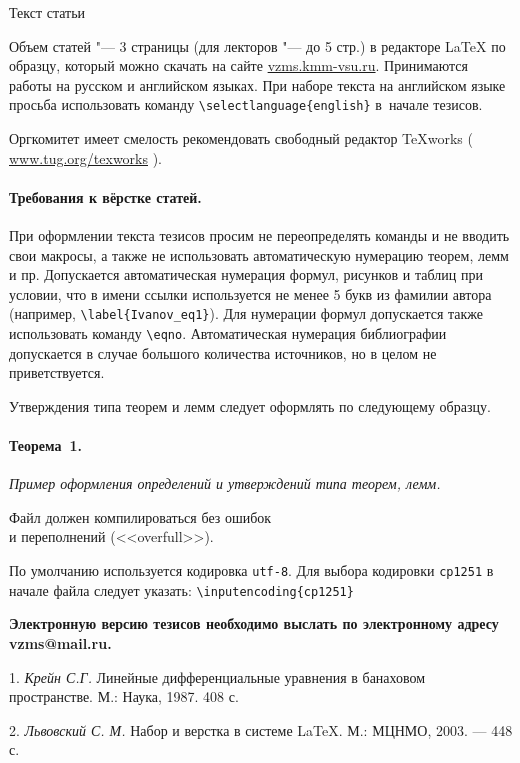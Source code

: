 \documentclass{vzmsthesis}
\begin{document}

\vzmscaption


Текст статьи


Объем статей "--- 3 страницы (для лекторов "--- до 5 стр.)
в редакторе \LaTeX{} по образцу, который можно скачать на
сайте \href{https://vzms.kmm-vsu.ru}{vzms.kmm-vsu.ru}.
Принимаются работы на русском и английском языках.
При наборе текста на английском языке просьба использовать команду
\verb`\selectlanguage{english}`
в~начале тезисов.

Оргкомитет имеет смелость рекомендовать свободный редактор TeXworks
( \href{https://www.tug.org/texworks/}{www.tug.org/texworks} ).

\paragraph{Требования к вёрстке статей.}
При оформлении текста тезисов просим не переопределять команды и не
вводить свои макросы, а также не использовать автоматическую
нумерацию теорем, лемм и пр.
Допускается автоматическая нумерация формул, рисунков и таблиц
при условии, что в имени ссылки используется не менее 5 букв из фамилии автора
(например, \verb`\label{Ivanov_eq1}`).
Для нумерации формул допускается также использовать команду \verb"\eqno".
Автоматическая нумерация библиографии допускается в случае большого количества источников,
но в целом не приветствуется.

Утверждения типа теорем и лемм следует оформлять по следующему
образцу.

\paragraph{Теорема~1.} {\it
	Пример оформления определений и утверждений типа теорем, лемм.
}

\begin{center}
	Файл должен компилироваться без ошибок \\
	и переполнений (<<overfull>>).
\end{center}

По умолчанию используется кодировка \verb`utf-8`.
Для выбора кодировки \verb`cp1251` в начале файла следует указать:
\verb`\inputencoding{cp1251}`


\begin{center}
	\textbf{Электронную версию тезисов необходимо выслать по электронному адресу vzms@mail.ru.}
\end{center}

\litlist

1. {\it Крейн С.Г.} Линейные дифференциальные уравнения в банаховом пространстве. М.: Наука, 1987. 408 с.

2. {\it Львовский С. М.} Набор и верстка в системе \LaTeX. М.: МЦНМО, 2003. — 448 с.
\end{document}

